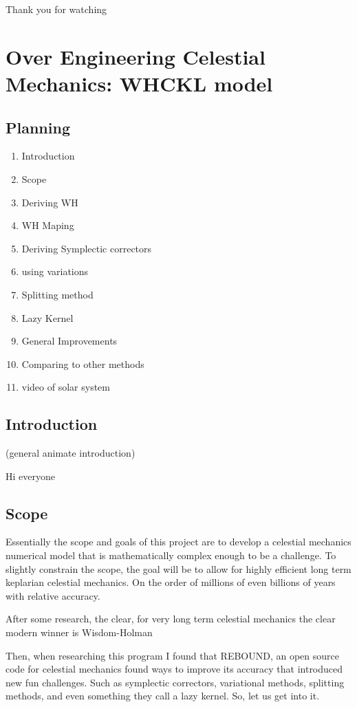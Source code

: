   Thank you for watching


\section{Over Engineering Celestial Mechanics: WHCKL model}

\subsection{Planning}%
\begin{enumerate}
  \item Introduction
  \item Scope
  \item Deriving WH
  \item WH Maping
  \item Deriving Symplectic correctors
  \item using variations
  \item Splitting method
  \item Lazy Kernel
  \item General Improvements
  \item Comparing to other methods
  \item video of solar system
\end{enumerate}

\subsection{Introduction}

(general animate introduction)

Hi everyone

\subsection{Scope}

Essentially the scope and goals of this project are to develop a celestial mechanics numerical model that is mathematically complex enough to be a challenge. To slightly constrain the scope, the goal will be to allow for highly efficient long term keplarian celestial mechanics. On the order of millions of even billions of years with relative accuracy.

After some research, the clear, for very long term celestial mechanics the clear modern winner is Wisdom-Holman

Then, when researching this program I found that REBOUND, an open source code for celestial mechanics found ways to improve its accuracy that introduced new fun challenges. Such as symplectic correctors, variational methods, splitting methods, and even something they call a lazy kernel. So, let us get into it.


